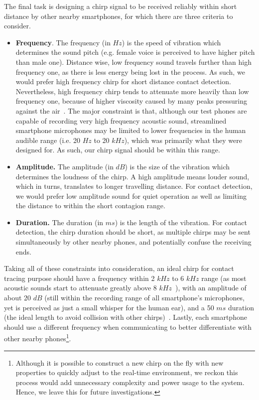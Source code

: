 \documentclass[graybox]{svmult}
\begin{document}
The final task is designing a chirp signal to be received reliably within short distance by other nearby smartphones, for which there are three criteria to consider.
\begin{itemize}
    \item \textbf{Frequency}. The frequency (in $Hz$) is the speed of vibration which determines the sound pitch (e.g. female voice is perceived to have higher pitch than male one). Distance wise, low frequency sound travels further than high frequency one, as there is less energy being lost in the process. As such, we would prefer high frequency chirp for short distance contact detection. Nevertheless, high frequency chirp tends to attenuate more heavily than low frequency one, because of higher viscosity caused by many peaks pressuring against the air~\cite{hoppe2012acoustic}. The major constraint is that, although our test phones are capable of recording very high frequency acoustic sound, streamlined smartphone microphones may be limited to lower frequencies in the human audible range (i.e. 20 $Hz$ to 20 $kHz$), which was primarily what they were designed for. As such, our chirp signal should be within this range.
    
    \item \textbf{Amplitude.} The amplitude (in $dB$) is the size of the vibration which determines the loudness of the chirp. A high amplitude means louder sound, which in turns, translates to longer travelling distance. For contact detection, we would prefer low amplitude sound for quiet operation as well as limiting the distance to within the short contagion range.
    
    \item \textbf{Duration.} The duration (in $ms$) is the length of the vibration. For contact detection, the chirp duration should be short, as multiple chirps may be sent simultaneously by other nearby phones, and potentially confuse the receiving ends.
\end{itemize}


Taking all of these constraints into consideration, an ideal chirp for contact tracing purpose should have a frequency within 2 $kHz$ to 6 $kHz$ range (as most acoustic sounds start to attenuate greatly above 8 $kHz$~\cite{peng2007beepbeep}), with an amplitude of about 20 $dB$ (still within the recording range of all smartphone's microphones, yet is perceived as just a small whisper for the human ear), and a 50 $ms$ duration (the ideal length to avoid collision with other chirps)~\cite{lazik2012indoor}. Lastly, each smartphone should use a different frequency when communicating to better differentiate with other nearby phones\footnote{Although it is possible to construct a new chirp on the fly with new properties to quickly adjust to the real-time environment, we reckon this process would add unnecessary complexity and power usage to the system. Hence, we leave this for future investigations.}.
\end{document}
